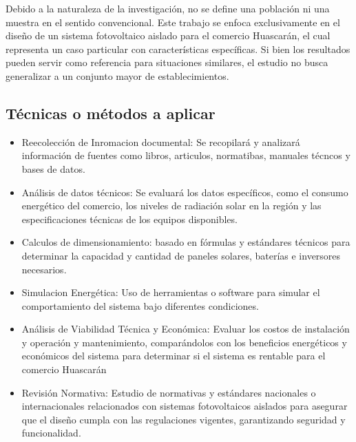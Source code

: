 Debido a la naturaleza de la investigación, no se define una población ni una muestra en el sentido convencional. Este trabajo se enfoca exclusivamente en el diseño de un sistema fotovoltaico aislado para el comercio Huascarán, el cual representa un caso particular con características específicas. Si bien los resultados pueden servir como referencia para situaciones similares, el estudio no busca generalizar a un conjunto mayor de establecimientos.

\subsection{Técnicas o métodos a aplicar}

\begin{itemize}

  \item Reecolección de Inromacion documental: Se recopilará y analizará información de fuentes como libros, articulos, normatibas, manuales técncos y bases de datos.
  
  \item Análisis de datos técnicos: Se evaluará los datos específicos, como el consumo energético del comercio, los niveles de radiación solar en la región y las especificaciones técnicas de los equipos disponibles.

  \item Calculos de dimensionamiento: basado en fórmulas y estándares técnicos para determinar la capacidad y cantidad de paneles solares, baterías e inversores necesarios.

  \item Simulacion Energética: Uso de herramientas o software para simular el comportamiento del sistema bajo diferentes condiciones.

  \item Análisis de Viabilidad Técnica y Económica: Evaluar los costos de instalación y operación y mantenimiento, comparándolos con los beneficios energéticos y económicos del sistema para determinar si el sistema es rentable para el comercio Huascarán

  \item Revisión Normativa: Estudio de normativas y estándares nacionales o internacionales relacionados con sistemas fotovoltaicos aislados para asegurar que el diseño cumpla con las regulaciones vigentes, garantizando seguridad y funcionalidad.

\end{itemize}
